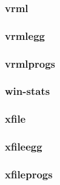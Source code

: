 \documentclass[a4paper]{article}
\begin{document}
\hypertarget{RefHeading23411167907073}{}\subsubsection{}
\clearpage\subsubsection[vrml]{vrml}
\hypertarget{RefHeading23431167907073}{}\subsubsection{}
\clearpage\subsubsection[vrmlegg]{vrmlegg}
\hypertarget{RefHeading23451167907073}{}\subsubsection{}
\clearpage\subsubsection[vrmlprogs]{vrmlprogs}
\hypertarget{RefHeading23471167907073}{}\subsubsection{}
\clearpage\subsubsection[win{}-stats]{win-stats}
\hypertarget{RefHeading23491167907073}{}\subsubsection{}
\clearpage\subsubsection[xfile]{xfile}
\hypertarget{RefHeading23511167907073}{}\subsubsection{}
\clearpage\subsubsection[xfileegg]{xfileegg}
\hypertarget{RefHeading23531167907073}{}\subsubsection{}
\clearpage\subsubsection[xfileprogs]{xfileprogs}
\hypertarget{RefHeading23551167907073}{}\clearpage
\bigskip
\end{document}
